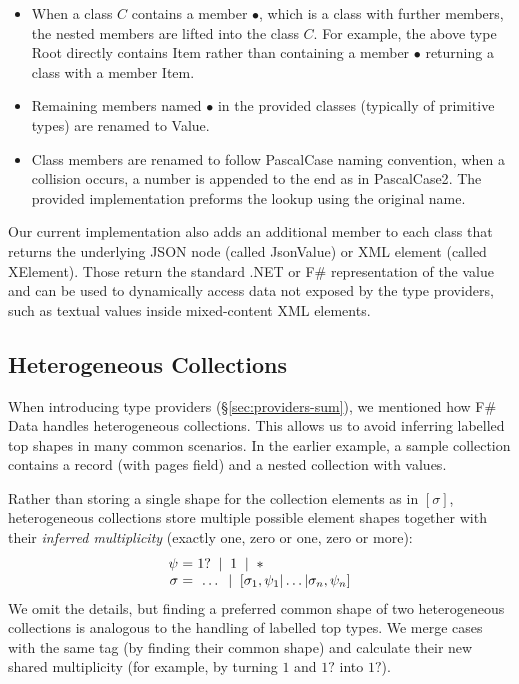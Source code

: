 \documentclass[pldi-cameraready]{sigplanconf-pldi16}
\newcommand{\strf}[1]{\textnormal{\textcolor{strclr}{\sffamily #1}}}
\newcommand{\ident}[1]{\textnormal{\sffamily #1}}
\newcommand{\lsep}[0]{\;\; | \;\;}
\newcommand{\narrow}[1]{\hspace{-0.7em} #1 \hspace{-0.7em}}
\begin{document}
\begin{itemize}
\item When a class $C$ contains a member $\bullet$, which is a class with further members, the
  nested members are lifted into the class $C$. For example, the above type \ident{Root}
  directly contains \ident{Item} rather than containing a member $\bullet$ returning a
  class with a member \ident{Item}.

\item Remaining members named $\bullet$ in the provided classes (typically of primitive
  types) are renamed to \ident{Value}.

\item Class members are renamed to follow \ident{PascalCase} naming convention, when a
  collision occurs, a number is appended to the end as in \ident{PascalCase2}. The provided
  implementation preforms the lookup using the original name.
\end{itemize}

Our current implementation also adds an additional member to each class that returns the
underlying JSON node (called \ident{JsonValue}) or XML element (called \ident{XElement}).
Those return the standard .NET or F\# representation of the value and can be used to dynamically
access data not exposed by the type providers, such as textual values inside mixed-content XML elements.


\subsection{Heterogeneous Collections}
\label{sec:impl-hetero}

When introducing type providers (\S\ref{sec:providers-sum}), we mentioned how F\# Data
handles heterogeneous collections. This allows us to avoid inferring
labelled top shapes in many common scenarios. In the earlier example, a sample collection
contains a record (with \strf{pages} field) and a nested collection with values.

Rather than storing a single shape for the collection elements as in $[\sigma]$, heterogeneous
collections store multiple possible element shapes together with their \emph{  inferred multiplicity}
(exactly one, zero or one, zero or more):
%
\begin{equation*}
\begin{array}{rcl}
 \psi &\narrow{=}& 1? \lsep 1 \lsep \ast \\
 \sigma &\narrow{=}& ~\ldots \lsep [\sigma_1, \psi_1 | \ldots | \sigma_n, \psi_n ]
\end{array}
\end{equation*}
%
We omit the details, but finding a preferred common shape of two heterogeneous
collections is analogous to the handling of labelled top types. We merge cases with the same tag (by finding
their common shape) and calculate their new shared multiplicity (for example, by turning
$1$ and $1?$ into $1?$).
\end{document}
